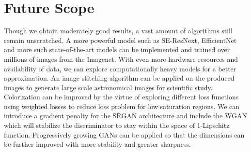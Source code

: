 \documentclass[conference]{IEEEtran}
\begin{document}
\section{Future Scope}
\hspace*{0.25 in}Though we obtain moderately good results, a vast amount of algorithms still remain unscratched. A more powerful model such as SE-ResNext, EfficientNet and more such state-of-the-art models can be implemented and trained over millions of images from the Imagenet. With even more hardware resources and availability of data, we can explore computationally heavy models for a better approximation. An image stitching algorithm can be applied on the produced images to generate large scale astronomical images for scientific study. Colorization can be improved by the virtue of exploring different loss functions using weighted losses to reduce loss problem for low saturation regions. We can introduce a gradient penalty for the SRGAN architecture and include the WGAN \citep{arjovsky2017wasserstein} which will stabilize the discriminator to stay within the space of 1-Lipschitz function. Progressively growing GANs \citep{karras2018progressive} can be applied so that the dimensions can be further improved with more stability and greater sharpness.



\end{document}
